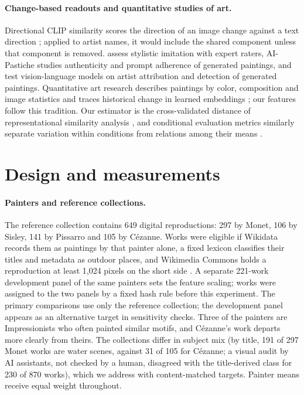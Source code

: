 \documentclass[10pt]{article}
\begin{document}
\paragraph{Change-based readouts and quantitative studies of art.}
Directional CLIP similarity scores the direction of an image change against a text direction
\citep{gal2022stylegannada,brooks2023instructpix2pix}; applied to artist names, it would include
the shared component unless that component is removed. \citet{deliege2025} assess stylistic
imitation with expert raters, AI-Pastiche \citep{asperti2025pastiche} studies authenticity and
prompt adherence of generated paintings, and \citet{fu2025aiwikiart} test vision-language models
on artist attribution and detection of generated paintings. Quantitative art research describes
paintings by color, composition and image statistics \citep{kim2014,sigaki2018,lee2020} and
traces historical change in learned embeddings \citep{kim2026}; our features follow this
tradition. Our estimator is the cross-validated distance of representational similarity analysis
\citep{diedrichsen2017representational}, and conditional evaluation metrics similarly separate
variation within conditions from relations among their means \citep{benny2021conditional}.

\section{Design and measurements}\label{sec:design}

\paragraph{Painters and reference collections.}
The reference collection contains 649 digital reproductions: 297 by Monet, 106 by Sisley, 141 by
Pissarro and 105 by C\'ezanne. Works were eligible if Wikidata records them as paintings by that
painter alone, a fixed lexicon classifies their titles and metadata as outdoor places, and
Wikimedia Commons holds a reproduction at least 1,024 pixels on the short side
\citep{wikimediacommons,vrandecic2014wikidata}. A separate 221-work development panel of the same
painters sets the feature scaling; works were assigned to the two panels by a fixed hash rule
before this experiment. The primary comparisons use only the reference collection; the
development panel appears as an alternative target in sensitivity checks. Three of the painters
are Impressionists who often painted similar motifs, and C\'ezanne's work departs more clearly
from theirs. The collections differ in subject mix (by title, 191 of 297 Monet works are water
scenes, against 31 of 105 for C\'ezanne; a visual audit by AI assistants, not checked by a human,
disagreed with the title-derived class for 230 of 870 works), which we address with
content-matched targets. Painter means receive equal weight throughout.
\end{document}
